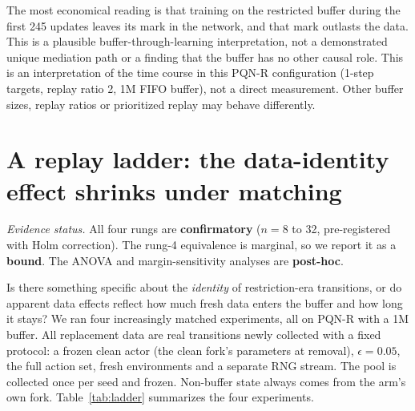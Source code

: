 \documentclass[10pt]{article} %
\begin{document}
The most economical reading is that training on the restricted buffer during the first 245 updates leaves its mark in the network, and that mark outlasts the data. This is a plausible buffer-through-learning interpretation, not a demonstrated unique mediation path or a finding that the buffer has no other causal role. This is an interpretation of the time course in this PQN-R configuration (1-step targets, replay ratio 2, 1M FIFO buffer), not a direct measurement. Other buffer sizes, replay ratios or prioritized replay may behave differently.

\section{A replay ladder: the data-identity effect shrinks under matching}\label{sec:ladder}

\noindent\textit{Evidence status.} All four rungs are \textbf{confirmatory} ($n=8$ to 32, pre-registered with Holm correction). The rung-4 equivalence is marginal, so we report it as a \textbf{bound}. The ANOVA and margin-sensitivity analyses are \textbf{post-hoc}.

Is there something specific about the \emph{identity} of restriction-era transitions, or do apparent data effects reflect how much fresh data enters the buffer and how long it stays? We ran four increasingly matched experiments, all on PQN-R with a 1M buffer. All replacement data are real transitions newly collected with a fixed protocol: a frozen clean actor (the clean fork's parameters at removal), $\epsilon=0.05$, the full action set, fresh environments and a separate RNG stream. The pool is collected once per seed and frozen. Non-buffer state always comes from the arm's own fork. Table~\ref{tab:ladder} summarizes the four experiments.
\end{document}
